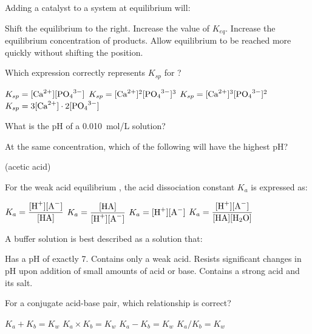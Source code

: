 \documentclass[addpoints]{exam}
\begin{document}
\begin{questions}
\question[1] Adding a catalyst to a system at equilibrium will:
\begin{choices}
    \choice Shift the equilibrium to the right.
    \choice Increase the value of $K_{eq}$.
    \choice Increase the equilibrium concentration of products.
    \correctchoice Allow equilibrium to be reached more quickly without shifting the position.
\end{choices}

\question[1] Which expression correctly represents $K_{sp}$ for ?
\begin{choices}
    \choice $K_{sp} = [\ce{Ca^{2+}}][\ce{PO4^{3-}}]$
    \choice $K_{sp} = [\ce{Ca^{2+}}]^2[\ce{PO4^{3-}}]^3$
    \correctchoice $K_{sp} = [\ce{Ca^{2+}}]^3[\ce{PO4^{3-}}]^2$
    \choice $K_{sp} = 3[\ce{Ca^{2+}}] \cdot 2[\ce{PO4^{3-}}]$
\end{choices}

\question[1] What is the pH of a \SI{0.010}{mol/L}  solution?
\begin{choices}
\end{choices}

\question[1] At the same concentration, which of the following will have the highest pH?
\begin{choices}
    \choice {}
    \choice {}
    \choice {}
    \correctchoice {} (acetic acid)
\end{choices}

\question[1] For the weak acid equilibrium , the acid
dissociation constant $K_a$ is expressed as:
\begin{choices}
    \correctchoice $K_a = \dfrac{[\ce{H+}][\ce{A-}]}{[\ce{HA}]}$
    \choice $K_a = \dfrac{[\ce{HA}]}{[\ce{H+}][\ce{A-}]}$
    \choice $K_a = [\ce{H+}][\ce{A-}]$
    \choice $K_a = \dfrac{[\ce{H+}][\ce{A-}]}{[\ce{HA}][\ce{H2O}]}$
\end{choices}

\question[1] A buffer solution is best described as a solution that:
\begin{choices}
    \choice Has a pH of exactly 7.
    \choice Contains only a weak acid.
    \correctchoice Resists significant changes in pH upon addition of small amounts of acid or base.
    \choice Contains a strong acid and its salt.
\end{choices}

\question[1] For a conjugate acid-base pair, which relationship is correct?
\begin{choices}
    \choice $K_a + K_b = K_w$
    \correctchoice $K_a \times K_b = K_w$
    \choice $K_a - K_b = K_w$
    \choice $K_a / K_b = K_w$
\end{choices}


\end{questions}
\end{document}
